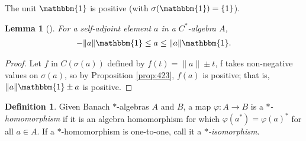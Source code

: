 \documentclass[12pt,a4paper]{report}
\theoremstyle{plain}
\newtheorem{lemma}{Lemma}
\theoremstyle{definition}
\newtheorem{defn}{Definition}
\newcommand{\1}{\mathbbm{1}}
\renewcommand{\phi}{\varphi}
\newcommand{\spec}[1]{\sigma(#1)}
\begin{document}
The unit $\1$ is positive (with $\spec \1 = \{1\}$). 

\begin{lemma}[{\cite[4.2.3(ii)]{kadison83}}]\label{lemma:423}
	For a self-adjoint element $a$ in a $C^\ast$-algebra $A$, 
	\begin{align*}
		-\|a\|\1\leq a\leq\|a\|\1.
	\end{align*}
\end{lemma}
\begin{proof}
	Let $f$ in $C(\spec a)$ defined by $f(t) = \|a\| \pm t$, f takes non-negative values on $\spec a$, so by Proposition \ref{prop:423}, $f(a)$ is positive; that is, $\|a\|\1 \pm a$ is positive.
\end{proof}
	
\begin{defn}
	Given Banach $\ast$-algebras $A$ and $B$, a map $\phi:A\to B$ is a \emph{$\ast$-homomorphism} 
	if it is an algebra homomorphism for which $\phi(a^\ast) = \phi(a)^\ast$ for all $a \in A$.
	If a $\ast$-homomorphism is one-to-one, call it a \emph{$\ast$-isomorphism}.
\end{defn}
\end{document}
